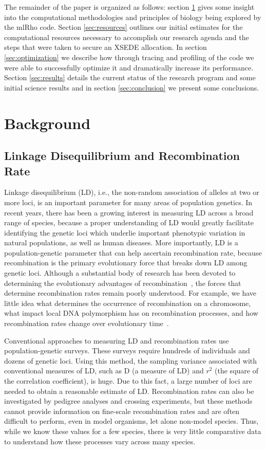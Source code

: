 \documentclass{sig-alternate}
\begin{document}
The remainder of the paper is organized as follows: section \ref{sec:background} gives some insight into the
computational methodologies and principles of biology being explored by the mlRho code. Section
\ref{sec:resources} outlines our initial estimates for the computational resources necessary to accomplish our
research agenda and the steps that were taken to secure an XSEDE allocation. In section \ref{sec:optimization}
we describe how through tracing and profiling of the code we were able to successfully optimize it and
dramatically increase its performance. Section \ref{sec:results} details the current status of the research
program and some initial science results and in section \ref{sec:conclusion} we present some conclusions.


\section{Background}\label{sec:background}


\subsection{Linkage Disequilibrium and Recombination Rate}\label{sec:LD}

Linkage disequilibrium (LD), i.e., the non-random association of alleles at two or more loci, is an important parameter for many areas of population genetics.  In recent years, there has been a growing interest in measuring LD across a broad range of species, because a proper understanding of LD would greatly facilitate identifying the genetic loci which underlie important phenotypic variation in natural populations, as well as human diseases. More importantly, LD is a population-genetic parameter that can help ascertain recombination rate, because recombination is the primary evolutionary force that breaks down LD among genetic loci. Although a substantial body of research has been devoted to determining the evolutionary advantages of recombination~\cite{resolving-paradox}, the forces that determine recombination rates remain poorly understood. For example, we have little idea what determines the occurrence of recombination on a chromosome, what impact local DNA polymorphism has on recombination processes, and how recombination rates change over evolutionary time~\cite{stumpf}. 

Conventional approaches to measuring LD and recombination rates use population-genetic surveys. These surveys require hundreds of individuals and dozens of genetic loci. Using this method, the sampling variance associated with conventional measures of LD, such as D (a measure of LD) and $r^2$ (the square of the correlation coefficient), is huge. Due to this fact, a large number of loci are needed to obtain a reasonable estimate of LD.  Recombination rates can also be investigated by pedigree analyses and crossing experiments, but these methods cannot provide information on fine-scale recombination rates and are often difficult to perform, even in model organisms, let alone non-model species. Thus, while we know these values for a few species, there is very little comparative data to understand how these processes vary across many species.
\end{document}
